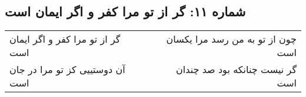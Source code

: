 \begin{center}
\section*{شماره ۱۱: گر از تو مرا کفر و اگر ایمان است}
\label{sec:011}
\begin{longtable}{l p{0.5cm} r}
گر از تو مرا کفر و اگر ایمان است
&&
چون از تو به من رسد مرا یکسان است
\\
آن دوستییی کز تو مرا در جان است
&&
گر نیست چنانکه بود صد چندان است
\\
\end{longtable}
\end{center}
